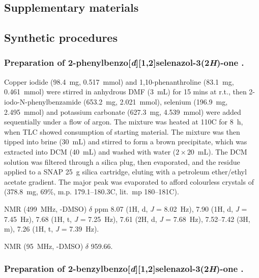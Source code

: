 \begin{refsection}
\section{Supplementary materials}

\subsection{Synthetic procedures}

\subsubsection[Preparation of \refcmpd{ebs}.]{Preparation of 2-phenylbenzo[\textit{d}][1,2]selenazol-3(2\textit{H})-one .}

Copper iodide (98.4~mg, 0.517~mmol) and 1,10-phenanthroline (83.1~mg, 0.461~mmol) were stirred in anhydrous DMF (3~mL) for 15 mins at r.t., then 2-iodo-N-phenylbenz\-amide (653.2~mg, 2.021~mmol), selenium (196.9~mg, 2.495~mmol) and potassium carbonate (627.3~mg, 4.539~mmol) were added sequentially under a flow of argon.
The mixture was heated at 110\degree{}C for 8~h, when TLC showed consumption of starting material.
The mixture was then tipped into brine (30~mL) and stirred to form a brown precipitate, which was extracted into DCM (40~mL) and washed with water ($ 2 \times 20 $~mL).
The DCM solution was filtered through a silica plug, then evaporated, and the residue applied to a SNAP 25~g silica cartridge, eluting with a petroleum ether/ethyl acetate gradient.
The major peak was evaporated to afford colourless crystals of  (378.8~mg, 69\%, m.p. 179.1--180.3\degree{}C, lit.\ mp 180--181\degree{}C). 

 NMR (499~MHz, -DMSO) $ \delta $ ppm 8.07 (1H, d, \textit{J} = 8.02~Hz), 7.90 (1H, d, \textit{J} = 7.45~Hz), 7.68 (1H, t, \textit{J} = 7.25~Hz), 7.61 (2H, d, \textit{J} = 7.68~Hz), 7.52--7.42 (3H, m), 7.26 (1H, t, \textit{J} = 7.39~Hz).

 NMR (95~MHz, -DMSO) $ \delta $ 959.66.

\subsubsection[Preparation of \refcmpd{ebs.bn}.]{Preparation of 2-benzylbenzo[\textit{d}][1,2]selenazol-3(2\textit{H})-one .}


\end{refsection}
